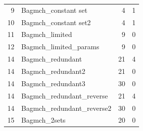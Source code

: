 \documentclass[11pt,journal]{IEEEtran}
\begin{document}
\begin{table}[h]
\begin{tabular}{@{}rlrr@{}}
	9                           & Bagmch\_constant set        & 4                                                                            & 1                                                                                       \\
	10                          & Bagmch\_constant set2       & 4                                                                            & 1                                                                                       \\
	11                          & Bagmch\_limited             & 9                                                                            & 0                                                                                       \\
	12                          & Bagmch\_limited\_params     & 9                                                                            & 0                                                                                       \\
	14                          & Bagmch\_redundant           & 21                                                                           & 4                                                                                       \\
	14                          & Bagmch\_redundant2          & 21                                                                           & 0                                                                                       \\
	14                          & Bagmch\_redundant3          & 30                                                                           & 0                                                                                       \\
	14                          & Bagmch\_redundant\_reverse  & 21                                                                           & 4                                                                                       \\
	14                          & Bagmch\_redundant\_reverse2 & 30                                                                           & 0                                                                                       \\
	15                          & Bagmch\_2sets               & 20                                                                           & 0                                                                                       \\

\end{tabular}
\end{table}
\end{document}

